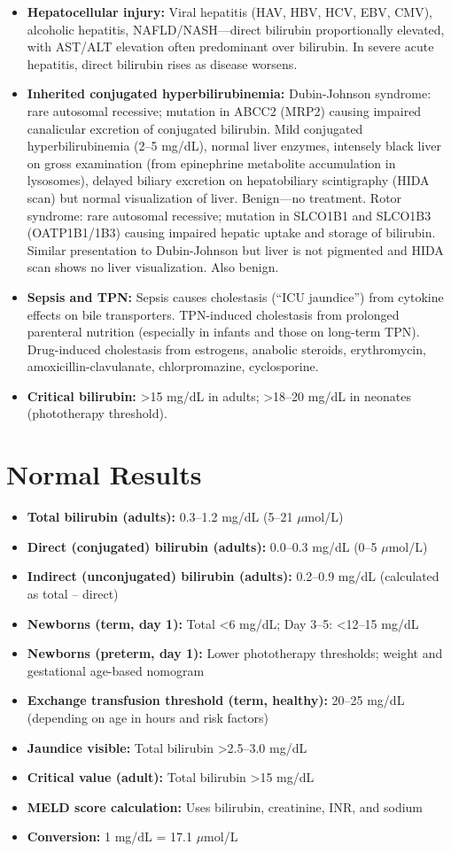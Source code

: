 \begin{itemize}
  \item \textbf{Hepatocellular injury:} Viral hepatitis (HAV, HBV, HCV, EBV, CMV), alcoholic hepatitis, NAFLD/NASH---direct bilirubin proportionally elevated, with AST/ALT elevation often predominant over bilirubin. In severe acute hepatitis, direct bilirubin rises as disease worsens.
  \item \textbf{Inherited conjugated hyperbilirubinemia:} Dubin-Johnson syndrome: rare autosomal recessive; mutation in ABCC2 (MRP2) causing impaired canalicular excretion of conjugated bilirubin. Mild conjugated hyperbilirubinemia (2--5 mg/dL), normal liver enzymes, intensely black liver on gross examination (from epinephrine metabolite accumulation in lysosomes), delayed biliary excretion on hepatobiliary scintigraphy (HIDA scan) but normal visualization of liver. Benign---no treatment. Rotor syndrome: rare autosomal recessive; mutation in SLCO1B1 and SLCO1B3 (OATP1B1/1B3) causing impaired hepatic uptake and storage of bilirubin. Similar presentation to Dubin-Johnson but liver is not pigmented and HIDA scan shows no liver visualization. Also benign.
  \item \textbf{Sepsis and TPN:} Sepsis causes cholestasis (``ICU jaundice'') from cytokine effects on bile transporters. TPN-induced cholestasis from prolonged parenteral nutrition (especially in infants and those on long-term TPN). Drug-induced cholestasis from estrogens, anabolic steroids, erythromycin, amoxicillin-clavulanate, chlorpromazine, cyclosporine.
  \item \textbf{Critical bilirubin:} >15 mg/dL in adults; >18--20 mg/dL in neonates (phototherapy threshold).
\end{itemize}

\section*{Normal Results}
\begin{itemize}
  \item \textbf{Total bilirubin (adults):} 0.3--1.2 mg/dL (5--21 $\mu$mol/L)
  \item \textbf{Direct (conjugated) bilirubin (adults):} 0.0--0.3 mg/dL (0--5 $\mu$mol/L)
  \item \textbf{Indirect (unconjugated) bilirubin (adults):} 0.2--0.9 mg/dL (calculated as total -- direct)
  \item \textbf{Newborns (term, day 1):} Total <6 mg/dL; Day 3--5: <12--15 mg/dL
  \item \textbf{Newborns (preterm, day 1):} Lower phototherapy thresholds; weight and gestational age-based nomogram
  \item \textbf{Exchange transfusion threshold (term, healthy):} 20--25 mg/dL (depending on age in hours and risk factors)
  \item \textbf{Jaundice visible:} Total bilirubin >2.5--3.0 mg/dL
  \item \textbf{Critical value (adult):} Total bilirubin >15 mg/dL
  \item \textbf{MELD score calculation:} Uses bilirubin, creatinine, INR, and sodium
  \item \textbf{Conversion:} 1 mg/dL = 17.1 $\mu$mol/L
\end{itemize}

